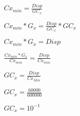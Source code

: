 \documentclass[conference,harvard,brazil,english]{sbatex}
\begin{document}
	$Cx_{min} = \frac{Disp}{GC_x} $\\
	\par $Cx_{min} * G_x = \frac{Disp}{GC_x} * GC_x$\\
	\par $Cx_{min} * G_x = Disp$\\
	\par $\frac{Cx_{min} * G_x}{Cx_{min}} = \frac{Disp}{Cx_{min}}$\\
	\par$GC_x = \frac{Disp}{Cx_{Min}}$\\
	\par$GC_x = \frac{60000}{600000}$\\
	\par$GC_x = 10^{-1}$
\end{document}
